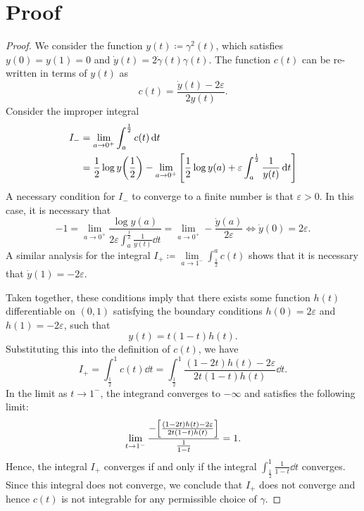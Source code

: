\section{Proof }\label{prf:lem:ni}
\restatelemni*

\begin{proof}
  We consider the function \(y(t) \coloneqq \gamma^{2}(t)\), which satisfies \(y(0) =y(1) = 0\) and \(\dot{y}(t) = 2 \dot{\gamma}(t) \gamma(t)\). The function \(c(t)\) can be re-written in terms of \(y(t)\) as
  \[
    c(t) = \frac{ \dot{y}(t) - 2\varepsilon}{2y(t)}.
  \]
  Consider the improper integral
  \begin{align*}
    I_{-} &= \lim\limits_{a \to 0^{+}} \int_{a}^{\frac{1}{2}} c(t) \dd{t} \\
    &= \frac{1}{2} \log y\qty(\frac{1}{2}) - \lim\limits_{a \to 0^{+}} \qty[\frac{1}{2} \log y(a) + \varepsilon \int_{a}^{\frac{1}{2}} \frac{1}{y(t)} \dd{t}]
  \end{align*}
  A necessary condition for \(I_{-}\) to converge to a finite number is that \(\varepsilon > 0\). In this case, it is necessary that
  \[
    -1 = \lim\limits_{a \to 0^{+}} \frac{\log y(a)}{2 \varepsilon \int_{a}^{\frac{1}{2}} \frac{1}{y(t)} \dd{t}} = \lim\limits_{a \to 0^{+}} -\frac{\dot{y}(a)}{ 2 \varepsilon} \iff \dot{y}(0) = 2\varepsilon.
  \]
  A similar analysis for the integral \(I_{+} \coloneqq \lim\limits_{a \to 1^{-}} \int_{\frac{1}{2}}^{a} c(t)\) shows that it is necessary that \(\dot{y}(1) = -2\varepsilon\).

  Taken together, these conditions imply that there exists some function \(h(t)\) differentiable on \((0, 1)\) satisfying the boundary conditions \(h(0) = 2\varepsilon\) and \(h(1) = -2\varepsilon\), such that
  \[
    y(t) =  t(1-t) h(t).
  \]
  Substituting this into the definition of \(c(t)\), we have
  \[
    I_{+} = \int_{\frac{1}{2}}^{1} c(t)\dd{t}= \int_{\frac{1}{2}}^{1} \frac{(1 - 2t) h(t) - 2\varepsilon}{2t(1-t) h(t)}\dd{t}.
  \]
  In the limit as \(t \to 1^{-}\), the integrand converges to \(-\infty\) and satisfies the following limit:
  \[
    \lim\limits_{t \to 1^{-}}  \frac{-\qty[\frac{(1-2t) h(t) - 2\varepsilon}{2t(1-t) h(t)}]}{\frac{1}{1-t}} = 1.
  \]
  Hence, the integral \(I_{+}\) converges if and only if the integral \(\int_{\frac{1}{2}}^{1} \frac{1}{1-t} \dd{t}\) converges. Since this integral does not converge, we conclude that \(I_{+}\) does not converge and hence \(c(t)\) is not integrable for any permissible choice of \(\gamma\).
\end{proof}


